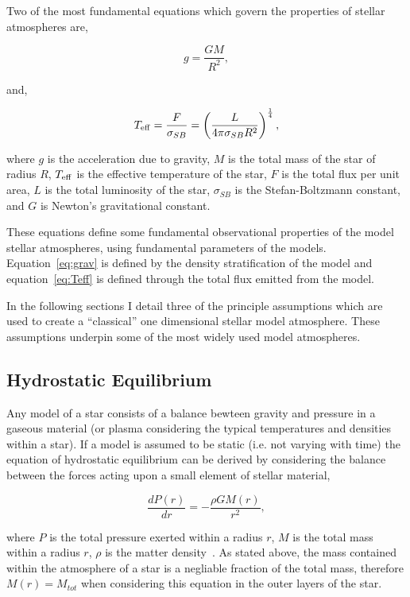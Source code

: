 Two of the most fundamental equations which govern the properties of stellar atmospheres are,

\begin{equation}
    g = \frac{GM}{R^2},\label{eq:grav}
\end{equation}

\noindent and,

\begin{equation}
    T_{\rm eff} = \frac{F}{\sigma_{SB}} = \left(\frac{L}{4\pi \sigma_{SB}R^2}\right)^\frac{1}{4},\label{eq:Teff}
\end{equation}

\noindent where $g$ is the acceleration due to gravity, $M$ is the total mass of the star of radius $R$, $T_{\rm eff}$ is the effective temperature of the star, $F$ is the total flux per unit area, $L$ is the total luminosity of the star, $\sigma_{SB}$ is the Stefan-Boltzmann constant,  and $G$ is Newton's gravitational constant.

These equations define some fundamental observational properties of the model stellar atmospheres, using fundamental parameters of the models.
Equation~\ref{eq:grav} is defined by the density stratification of the model and equation~\ref{eq:Teff} is defined through the total flux emitted from the model.

In the following sections I detail three of the principle assumptions which are used to create a ``classical'' one dimensional stellar model atmosphere.
These assumptions underpin some of the most widely used model atmospheres.


\subsection{Hydrostatic Equilibrium} %
\label{sub:hydrostatic_equilibrium}

Any model of a star consists of a balance bewteen gravity and pressure in a gaseous material (or plasma considering the typical temperatures and densities within a star).
If a model is assumed to be static (i.e. not varying with time) the equation of hydrostatic equilibrium can be derived by considering the balance between the forces acting upon a small element of stellar material,

\begin{equation}
    \frac{dP(r)}{dr} = -\frac{\rho GM(r)}{r^2},\label{eq:hydro}
\end{equation}

\noindent where $P$ is the total pressure exerted within a radius $r$, $M$ is the total mass within a radius $r$, $\rho$ is the matter density~\citep[see Chapter 9 of ][for a simple derivation of this equation]{1989isa2.book.....B}.
As stated above, the mass contained within the atmosphere of a star is a negliable fraction of the total mass, therefore $M(r) = M_{tot}$ when considering this equation in the outer layers of the star.

